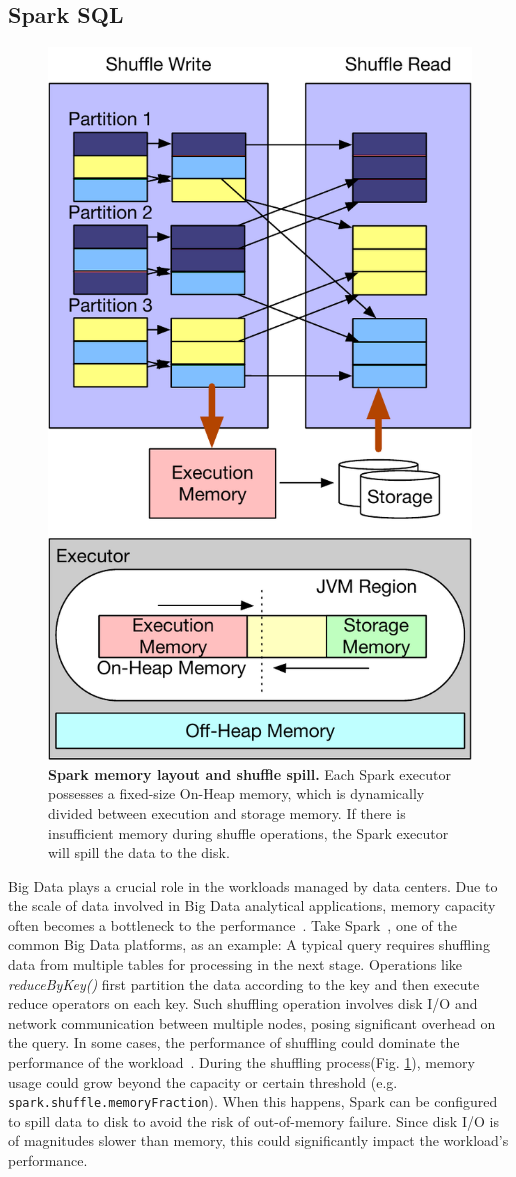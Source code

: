 \subsection{Spark SQL}
\begin{figure}[t]
\centering
 \includegraphics[width=0.5\columnwidth]{fig/cxl/spark.pdf}
  \caption{\textbf{Spark memory layout and shuffle spill.} Each Spark executor possesses a fixed-size On-Heap memory, which is dynamically divided between execution and storage memory. If there is insufficient memory during shuffle operations, the Spark executor will spill the data to the disk.}
\label{fig:eval_spark_0}
\end{figure}
Big Data plays a crucial role in the workloads managed by data centers. Due to the scale of data involved in Big Data analytical applications, memory capacity often becomes a bottleneck to the performance~\cite{sparkmemory}. Take Spark~\cite{spark}, one of the common Big Data platforms, as an example: A typical query requires shuffling data from multiple tables for processing in the next stage. Operations like \textit{reduceByKey()} first partition the data according to the key and then execute reduce operators on each key. Such shuffling operation involves disk I/O and network communication between multiple nodes, posing significant overhead on the query. In some cases, the performance of shuffling could dominate the performance of the workload~\cite{PSACS}. During the shuffling process(Fig. \ref{fig:eval_spark_0}), memory usage could grow beyond the capacity or certain threshold (e.g. \texttt{spark.shuffle.memoryFraction}). When this happens, Spark can be configured to spill data to disk to avoid the risk of out-of-memory failure. Since disk I/O is of magnitudes slower than memory, this could significantly impact the workload's performance.

